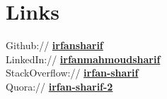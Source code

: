 \documentclass[letterpaper]{deedy-resume}
\begin{document}
\begin{minipage}[t]{0.33\textwidth}

\section{Links} 

Github:// \href{https://github.com/irfansharif}{\bf irfansharif} \\
LinkedIn:// \href{https://ca.linkedin.com/in/irfanmahmoudsharif
}{\bf irfanmahmoudsharif
} \\
StackOverflow:// \href{http://stackoverflow.com/users/4930863/irfan-sharif}{\bf irfan-sharif}\\
Quora:// \href{http://www.quora.com/Irfan-Sharif-2}{\bf irfan-sharif-2}


\end{minipage} %
\hfill
%
%
\end{document}
